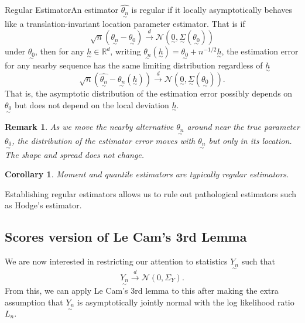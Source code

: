 \documentclass[twoside]{article}
\newtheorem{corollary}[theorem]{Corollary}
\newtheorem{remark}[theorem]{Remark}
\newcommand{\utilde}{\underset{\sim}}
\begin{document}
\begin{definition_exam}{Regular Estimator}{}An estimator $\hat{\utilde{\theta_n}}$ is regular if it locally asymptotically behaves like a translation-invariant location parameter estimator. That is if
$$
\sqrt{n}(\hat{\utilde{\theta_n}} - \utilde{\theta_0}) \xrightarrow{d} \mathcal{N}(\utilde{0}, \utilde{\Sigma}(\utilde{\theta_{0}}))
$$
under $\utilde{\theta_0}$, then for any $\utilde{h} \in \mathbb{R}^d$, writing $\utilde{\theta_n}(\utilde{h}) = \utilde{\theta_0} + n^{-1/2}\utilde{h}$, the estimation error for any nearby sequence has the same limiting distribution regardless of $\utilde{h}$ 
$$
\sqrt{n}(\hat{\utilde{\theta_n}} - \utilde{\theta_{n}}(\utilde{h})) \xrightarrow{d} \mathcal{N}(\utilde{0}, \utilde{\Sigma}(\utilde{\theta_0})).
$$
That is, the asymptotic distribution of the estimation error possibly depends on $\utilde{\theta_0}$ but does not depend on the local deviation $\utilde{h}.$ 
\end{definition_exam}

\begin{remark}
As we move the nearby alternative $\utilde{\theta_n}$ around near the true parameter $\utilde{\theta_0}$, the distribution of the estimator error moves with $\utilde{\theta_n}$ but only in its location. The shape and spread does not change.
\end{remark}

\begin{corollary} Moment and quantile estimators are typically regular estimators.
\end{corollary}

Establishing regular estimators allows us to rule out pathological estimators such as Hodge's estimator.

\subsection{Scores version of Le Cam's 3rd Lemma}
We are now interested in restricting our attention to statistics $\utilde{Y_n}$ such that 
$$
\utilde{Y_n} \xrightarrow{d} \mathcal{N}(0, \Sigma_Y).
$$
From this, we can apply Le Cam's 3rd lemma to this after making the extra assumption that $\utilde{Y_n}$ is asymptotically jointly normal with the log likelihood ratio $L_n.$
\end{document}
